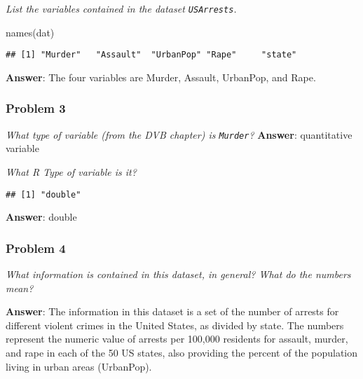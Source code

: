 \documentclass[
]{article}
\newenvironment{Shaded}{\begin{snugshade}}{\end{snugshade}}
\newcommand{\FunctionTok}[1]{\textcolor[rgb]{0.00,0.00,0.00}{#1}}
\newcommand{\NormalTok}[1]{#1}
\newcommand{\SpecialCharTok}[1]{\textcolor[rgb]{0.00,0.00,0.00}{#1}}
\begin{document}
\emph{List the variables contained in the dataset \texttt{USArrests}.}

\begin{Shaded}
\begin{Highlighting}[]
\FunctionTok{names}\NormalTok{(dat)}
\end{Highlighting}
\end{Shaded}

\begin{verbatim}
## [1] "Murder"   "Assault"  "UrbanPop" "Rape"     "state"
\end{verbatim}

\textbf{Answer}: The four variables are Murder, Assault, UrbanPop, and
Rape.

\hypertarget{problem-3}{%
\subsubsection{Problem 3}\label{problem-3}}

\emph{What type of variable (from the DVB chapter) is \texttt{Murder}? }
\textbf{Answer}: quantitative variable

\emph{What R Type of variable is it?}

\begin{Shaded}
\end{Shaded}

\begin{verbatim}
## [1] "double"
\end{verbatim}

\textbf{Answer}: double

\hypertarget{problem-4}{%
\subsubsection{Problem 4}\label{problem-4}}

\emph{What information is contained in this dataset, in general? What do
the numbers mean? }

\textbf{Answer}: The information in this dataset is a set of the number
of arrests for different violent crimes in the United States, as divided
by state. The numbers represent the numeric value of arrests per 100,000
residents for assault, murder, and rape in each of the 50 US states,
also providing the percent of the population living in urban areas
(UrbanPop).
\end{document}
